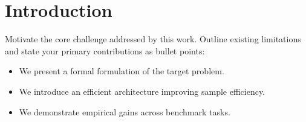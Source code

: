 \section{Introduction}
\label{sec:intro}

Motivate the core challenge addressed by this work. Outline existing limitations and state your primary contributions as bullet points:

\begin{itemize}
    \item We present a formal formulation of the target problem.
    \item We introduce an efficient architecture improving sample efficiency.
    \item We demonstrate empirical gains across benchmark tasks.
\end{itemize}
